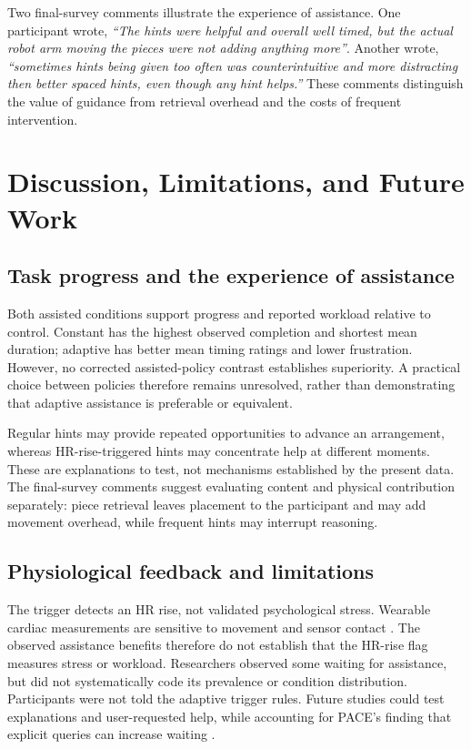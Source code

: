 \documentclass[sigconf,anonymous]{aamas}
\begin{document}
Two final-survey comments illustrate the experience of assistance. One participant wrote, \textit{``The hints were helpful and overall well timed, but the actual robot arm moving the pieces were not adding anything more''}. Another wrote, \textit{``sometimes hints being given too often was counterintuitive and more distracting then better spaced hints, even though any hint helps.''} These comments distinguish the value of guidance from retrieval overhead and the costs of frequent intervention.

\section{Discussion, Limitations, and Future Work}

\subsection{Task progress and the experience of assistance}
Both assisted conditions support progress and reported workload relative to control. Constant has the highest observed completion and shortest mean duration; adaptive has better mean timing ratings and lower frustration. However, no corrected assisted-policy contrast establishes superiority. A practical choice between policies therefore remains unresolved, rather than demonstrating that adaptive assistance is preferable or equivalent.

Regular hints may provide repeated opportunities to advance an arrangement, whereas HR-rise-triggered hints may concentrate help at different moments. These are explanations to test, not mechanisms established by the present data. The final-survey comments suggest evaluating content and physical contribution separately: piece retrieval leaves placement to the participant and may add movement overhead, while frequent hints may interrupt reasoning.

\subsection{Physiological feedback and limitations}
The trigger detects an HR rise, not validated psychological stress. Wearable cardiac measurements are sensitive to movement and sensor contact \cite{quigley2024}. The observed assistance benefits therefore do not establish that the HR-rise flag measures stress or workload. Researchers observed some waiting for assistance, but did not systematically code its prevalence or condition distribution. Participants were not told the adaptive trigger rules. Future studies could test explanations and user-requested help, while accounting for PACE's finding that explicit queries can increase waiting \cite{delazzari2025}.
\end{document}
